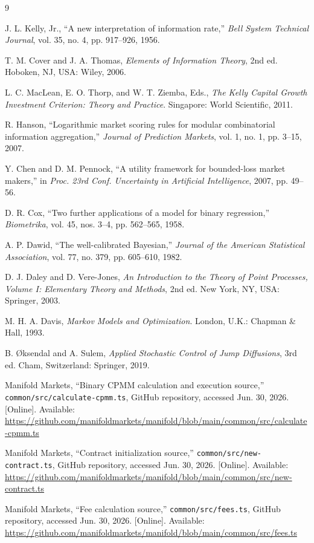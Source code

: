 \documentclass[journal, a4paper]{IEEEtran}
\begin{document}
\begin{thebibliography}{9}

J. L. Kelly, Jr., ``A new interpretation of information rate,'' \emph{Bell System Technical Journal}, vol. 35, no. 4, pp. 917--926, 1956.


T. M. Cover and J. A. Thomas, \emph{Elements of Information Theory}, 2nd ed. Hoboken, NJ, USA: Wiley, 2006.

L. C. MacLean, E. O. Thorp, and W. T. Ziemba, Eds., \emph{The Kelly Capital Growth Investment Criterion: Theory and Practice}. Singapore: World Scientific, 2011.

R. Hanson, ``Logarithmic market scoring rules for modular combinatorial information aggregation,'' \emph{Journal of Prediction Markets}, vol. 1, no. 1, pp. 3--15, 2007.

Y. Chen and D. M. Pennock, ``A utility framework for bounded-loss market makers,'' in \emph{Proc. 23rd Conf. Uncertainty in Artificial Intelligence}, 2007, pp. 49--56.

D. R. Cox, ``Two further applications of a model for binary regression,'' \emph{Biometrika}, vol. 45, nos. 3--4, pp. 562--565, 1958.

A. P. Dawid, ``The well-calibrated Bayesian,'' \emph{Journal of the American Statistical Association}, vol. 77, no. 379, pp. 605--610, 1982.

D. J. Daley and D. Vere-Jones, \emph{An Introduction to the Theory of Point Processes, Volume I: Elementary Theory and Methods}, 2nd ed. New York, NY, USA: Springer, 2003.

M. H. A. Davis, \emph{Markov Models and Optimization}. London, U.K.: Chapman \& Hall, 1993.

B. \O ksendal and A. Sulem, \emph{Applied Stochastic Control of Jump Diffusions}, 3rd ed. Cham, Switzerland: Springer, 2019.


Manifold Markets, ``Binary CPMM calculation and execution source,'' \texttt{common/src/calculate-cpmm.ts}, GitHub repository, accessed Jun. 30, 2026. [Online]. Available: \url{https://github.com/manifoldmarkets/manifold/blob/main/common/src/calculate-cpmm.ts}

Manifold Markets, ``Contract initialization source,'' \texttt{common/src/new-contract.ts}, GitHub repository, accessed Jun. 30, 2026. [Online]. Available: \url{https://github.com/manifoldmarkets/manifold/blob/main/common/src/new-contract.ts}

Manifold Markets, ``Fee calculation source,'' \texttt{common/src/fees.ts}, GitHub repository, accessed Jun. 30, 2026. [Online]. Available: \url{https://github.com/manifoldmarkets/manifold/blob/main/common/src/fees.ts}

\end{thebibliography}
\end{document}
